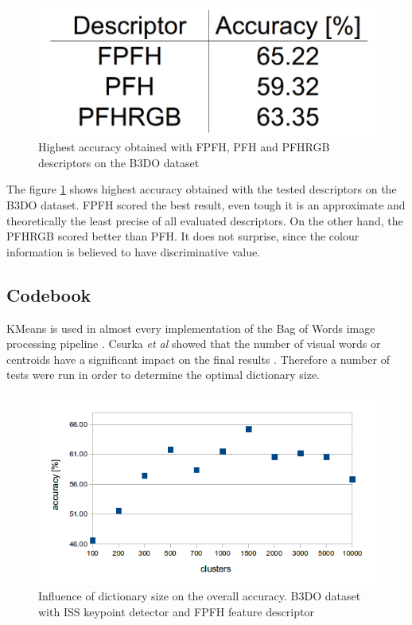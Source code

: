 	\begin{figure}[!ht]
	\centering	
	\includegraphics[width=.75\textwidth]{figs/desc_b3do}
	\caption{Highest accuracy obtained with FPFH, PFH and PFHRGB descriptors on the B3DO dataset}
	\label{fig:desc_b3do}
	\end{figure}
	
	The figure \ref{fig:desc_b3do} shows highest accuracy obtained with the tested descriptors on the B3DO dataset. FPFH scored the best result, even tough it is an approximate and theoretically the least precise of all evaluated descriptors. On the other hand, the PFHRGB scored better than PFH. It does not surprise, since the colour information is believed to have discriminative value.
		
	\subsection{Codebook}
	KMeans is used in almost every implementation of the Bag of Words image processing pipeline \cite{tsai2012bag, toldo2009bag}. Csurka \emph{et al} showed that the number of visual words or centroids have a significant impact on the final results \cite{csurka2004visual}. Therefore a number of tests were run in order to determine the optimal dictionary size.
	
	\begin{figure}[!ht]
	\centering	
	\includegraphics[width=.75\textwidth]{figs/clustering_centroids_b3do}
	\caption{Influence of dictionary size on the overall accuracy. B3DO dataset with ISS keypoint detector and FPFH feature descriptor}
	\label{fig:cluster_b3do}
	\end{figure}
	
